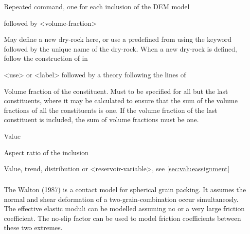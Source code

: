 {
 \slist
   \item \Description Repeated command, one for each inclusion of the DEM model
   \item {} followed by <volume-fraction>
   \item \Default
 \elist

 \slist
   \item \Description  May define a new dry-rock here, or use a predefined  from  using the keyword  followed by the unique name of the dry-rock. When a new dry-rock is defined, follow the construction of  in 
   \item \Argument <use> or <label> followed by a theory following the lines of 
   \item \Default
 \elist

 \slist
   \item \Description Volume fraction of the constituent. Must to be specified for all but the last constituents, where it may be calculated to ensure that the sum of the volume fractions of all the constituents is one. If the volume fraction of the last constituent is included, the sum of volume fractions must be one. 
   \item \Argument Value
   \item \Default
 \elist

 \slist
   \item \Description Aspect ratio of the inclusion
   \item \Argument Value, trend, distribution or <reservoir-variable>, see \autoref{sec:valueassignment}
   \item \Default
 \elist

\subparagraph{}
 \slist
   \item \Description The Walton (1987) is a contact model for spherical grain packing. It assumes the normal and shear deformation of a two-grain-combination occur simultaneosly. The effective elastic moduli can be modelled assuming no or a very large friction coefficient. The no-slip factor can be used to model friction coefficients between these two extremes.
   \item \Argument
   \item \Default 
 \elist

}
